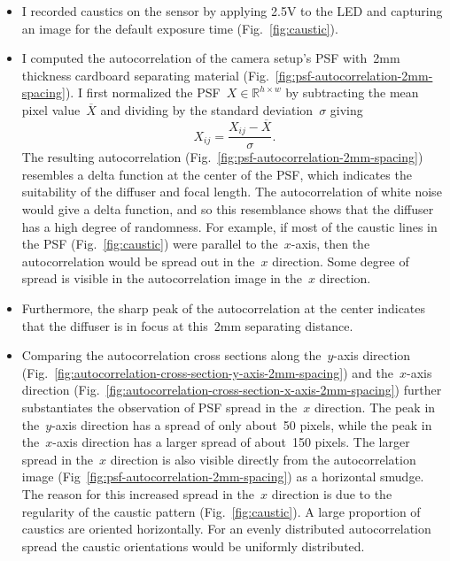 \documentclass[final]{cvpr}
\begin{document}
\begin{itemize}
	\item I recorded caustics on the sensor by applying 2.5V to the LED and capturing an image for the default exposure time (Fig.~\ref{fig:caustic}).

	\item I computed the autocorrelation of the camera setup's PSF
	      with~\num{2}mm thickness cardboard separating material
	      (Fig.~\ref{fig:psf-autocorrelation-2mm-spacing}).
	      I first normalized the PSF~$X\in\mathbb{R}^{h\times w}$ by
	      subtracting the mean pixel value~$\overline{X}$ and dividing by the standard
	      deviation~$\sigma$ giving
	      \begin{equation}
		      X_{ij} = \frac{X_{ij} - \overline{X}}{\sigma}.
	      \end{equation}
	      The resulting autocorrelation
	      (Fig.~\ref{fig:psf-autocorrelation-2mm-spacing}) resembles a
	      delta function at the center of the PSF, which indicates the
	      suitability of the diffuser and focal length.
	      The autocorrelation of white noise would give a delta function,
	      and so this resemblance shows that the diffuser has a high degree
	      of randomness.
	      For example, if most of the caustic lines in the PSF
	      (Fig.~\ref{fig:caustic}) were parallel to the~$x$-axis, then the
	      autocorrelation would be spread out in the~$x$ direction.
	      Some degree of spread is visible in the autocorrelation image in
	      the~$x$ direction.

	\item Furthermore, the sharp peak of the autocorrelation at the center
	      indicates that the diffuser is in focus at this~\num{2}mm
	      separating distance.

	\item Comparing the autocorrelation cross sections along the~$y$-axis
	      direction
	      (Fig.~\ref{fig:autocorrelation-cross-section-y-axis-2mm-spacing})
	      and the~$x$-axis direction
	      (Fig.~\ref{fig:autocorrelation-cross-section-x-axis-2mm-spacing})
	      further substantiates the observation of PSF spread in the~$x$
	      direction.
	      The peak in the~$y$-axis direction has a spread of only
	      about~\num{50} pixels, while the peak in the~$x$-axis direction
	      has a larger spread of about~\num{150} pixels.
	      The larger spread in the~$x$ direction is also visible directly
	      from the autocorrelation image
	      (Fig~\ref{fig:psf-autocorrelation-2mm-spacing}) as a horizontal
	      smudge.
	      The reason for this increased spread in the~$x$ direction is due
	      to the regularity of the caustic pattern
	      (Fig.~\ref{fig:caustic}).
	      A large proportion of caustics are oriented horizontally.
	      For an evenly distributed autocorrelation spread the caustic
	      orientations would be uniformly distributed.


\end{itemize}
\end{document}
